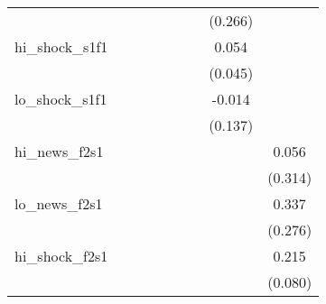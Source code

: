 {\begin{tabular}{l*{8}{c}}
            &                     &                     &                     &                     &                     &                     &     (0.266)         &                     \\
\addlinespace
hi\_shock\_s1f1&                     &                     &                     &                     &                     &                     &       0.054         &                     \\
            &                     &                     &                     &                     &                     &                     &     (0.045)         &                     \\
\addlinespace
lo\_shock\_s1f1&                     &                     &                     &                     &                     &                     &      -0.014         &                     \\
            &                     &                     &                     &                     &                     &                     &     (0.137)         &                     \\
\addlinespace
hi\_news\_f2s1&                     &                     &                     &                     &                     &                     &                     &       0.056         \\
            &                     &                     &                     &                     &                     &                     &                     &     (0.314)         \\
\addlinespace
lo\_news\_f2s1&                     &                     &                     &                     &                     &                     &                     &       0.337         \\
            &                     &                     &                     &                     &                     &                     &                     &     (0.276)         \\
\addlinespace
hi\_shock\_f2s1&                     &                     &                     &                     &                     &                     &                     &       0.215\sym{**} \\
            &                     &                     &                     &                     &                     &                     &                     &     (0.080)         \\

\end{tabular}}
